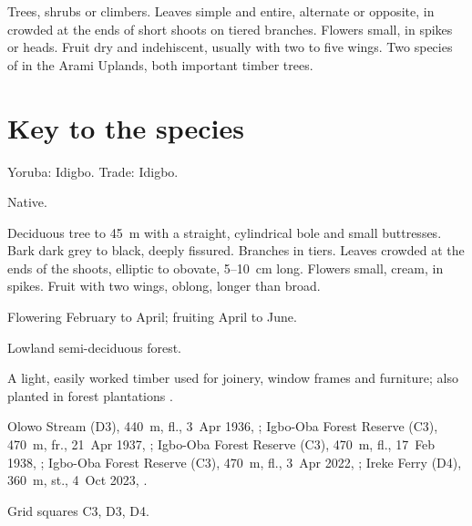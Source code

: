 \label{fam:combretaceae}

Trees, shrubs or climbers. Leaves simple and entire, alternate or
opposite, in  crowded at the ends of short shoots on
tiered branches. Flowers small, in spikes or heads. Fruit dry and
indehiscent, usually with two to five wings. Two species of
 in the Arami Uplands, both important timber trees.

\section*{Key to the species}
\begin{florakey}
\end{florakey}

\label{sp:COM01}

 Yoruba: Idigbo. Trade: Idigbo.

 Native.

 Deciduous tree to 45~m with a straight,
cylindrical bole and small buttresses. Bark dark grey to black, deeply
fissured. Branches in tiers. Leaves crowded at the ends of the shoots,
elliptic to obovate, 5--10~cm long. Flowers small, cream, in spikes.
Fruit with two wings, oblong, longer than broad.

 Flowering February to April; fruiting April to June.

 Lowland semi-deciduous forest.

 A light, easily worked timber used for joinery, window
frames and furniture; also planted in forest plantations
\citep{louppe2008}.

 Olowo Stream (D3), 440~m, fl., 3~Apr 1936, ;
Igbo-Oba Forest Reserve (C3), 470~m, fr., 21~Apr 1937, ;
Igbo-Oba Forest Reserve (C3), 470~m, fl., 17~Feb 1938, ;
Igbo-Oba Forest Reserve (C3), 470~m, fl., 3~Apr 2022, ;
Ireke Ferry (D4), 360~m, st., 4~Oct 2023, .

 Grid squares C3, D3, D4.

